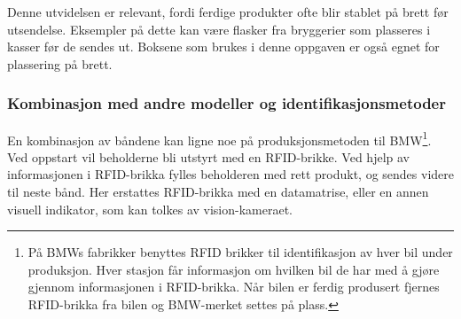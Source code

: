 \documentclass[Visionprosjekt.tex]{subfiles}
\begin{document}
Denne utvidelsen er relevant, fordi ferdige produkter ofte blir stablet på brett før utsendelse. Eksempler på dette kan være flasker fra bryggerier som plasseres i kasser før de sendes ut. Boksene som brukes i denne oppgaven er også egnet for plassering på brett.





\subsubsection{Kombinasjon med andre modeller og identifikasjonsmetoder}

En kombinasjon av båndene kan ligne noe på produksjonsmetoden til BMW\footnote{
På BMWs fabrikker benyttes RFID brikker til identifikasjon av hver bil under produksjon. Hver stasjon får informasjon om hvilken bil de har med å gjøre gjennom informasjonen i RFID-brikka. Når bilen er ferdig produsert fjernes RFID-brikka fra bilen og BMW-merket settes på plass.
}.
Ved oppstart vil beholderne bli utstyrt med en RFID-brikke. Ved hjelp av informasjonen i RFID-brikka fylles beholderen med rett produkt, og sendes videre til neste bånd. Her erstattes RFID-brikka med en datamatrise, eller en annen visuell indikator, som kan tolkes av vision-kameraet.

%
%
%
%
\end{document}
